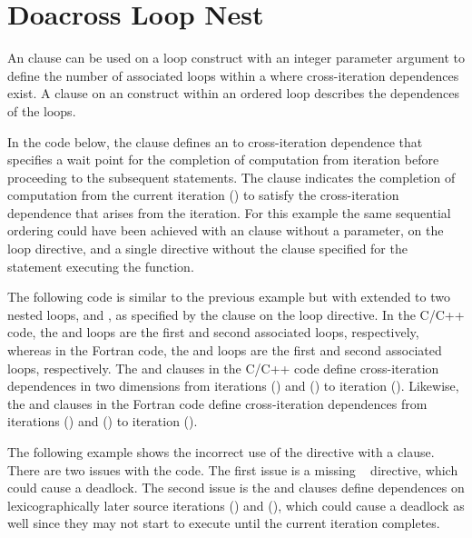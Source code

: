 \pagebreak
\section{Doacross Loop Nest}
\label{sec:doacross}

An  clause can be used on a loop construct with an integer
parameter argument to define the number of associated loops within 
a  where cross-iteration dependences exist.
A  clause on an  construct within an ordered 
loop describes the dependences of the  loops. 

In the code below, the  clause defines an  
to  cross-iteration dependence that specifies a wait point for 
the completion of computation from iteration  before proceeding 
to the subsequent statements. The  clause indicates 
the completion of computation from the current iteration () 
to satisfy the cross-iteration dependence that arises from the iteration.
For this example the same sequential ordering could have been achieved 
with an  clause without a parameter, on the loop directive, 
and a single  directive without the  clause
specified for the statement executing the  function.



The following code is similar to the previous example but with 
 extended to two nested loops,  and , 
as specified by the  clause on the loop directive. 
In the C/C++ code, the  and  loops are the first and
second associated loops, respectively, whereas
in the Fortran code, the  and  loops are the first and
second associated loops, respectively.
The  and  clauses in 
the C/C++ code define cross-iteration dependences in two dimensions from 
iterations () and () to iteration ().  
Likewise, the  and  clauses 
in the Fortran code define cross-iteration dependences from iterations 
() and () to iteration ().




The following example shows the incorrect use of the  
directive with a  clause.  There are two issues with the code.  
The first issue is a missing ~ directive,
which could cause a deadlock.  
The second issue is the  and  
clauses define dependences on lexicographically later 
source iterations () and (), which could cause 
a deadlock as well since they may not start to execute until the current iteration completes.

